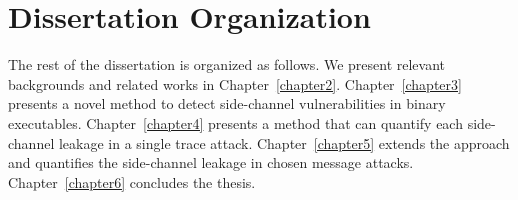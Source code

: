 \section{Dissertation Organization}
The rest of the dissertation is organized as follows. We present relevant backgrounds and related works in Chapter~\ref{chapter2}. Chapter~\ref{chapter3} presents a novel method to detect side-channel vulnerabilities in binary executables. Chapter~\ref{chapter4} presents a method that can quantify each side-channel leakage in a single trace attack. Chapter~\ref{chapter5} extends the approach and quantifies the side-channel leakage in chosen message attacks. Chapter~\ref{chapter6} concludes the thesis.